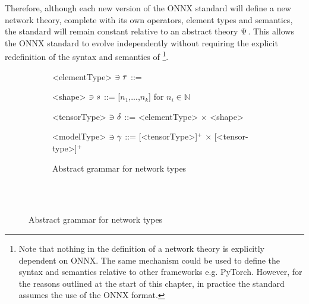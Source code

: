 Therefore, although each new version of the ONNX standard will define a new network theory, complete with its own operators, element types and semantics, the \vnnlib{} standard will remain constant relative to an abstract theory $\Psi$.
This allows the ONNX standard to evolve independently without requiring the explicit redefinition of the syntax and semantics of \vnnlib{}\footnote{
Note that nothing in the definition of a network theory is explicitly dependent on ONNX. 
The same mechanism could be used to define the syntax and semantics relative to other frameworks e.g. PyTorch. 
However, for the reasons outlined at the start of this chapter, in practice the \vnnlib{} standard assumes the use of the ONNX format.
}.

\begin{figure}
	\newcommand{\tensorOpOneSem}[2]{ 
		\semTensorType(#1) \rightarrow 
		\semTensorType(#2)
	}
	\newcommand{\tensorOpTwoSem}[3]{
		\semTensorType(#1) \rightarrow 
		\semTensorType(#2) \rightarrow 
		\semTensorType(#3) 
	}
	\newcommand{\compSem}[1]{
	\sem{#1} 
	&: \forall \tensorTypeVar. \; 
			\semTensorType(\tensorTypeVar) \rightarrow
			\semTensorType(\tensorTypeVar) \rightarrow
			\mathbb{B}
	&= \missing 
	}
	\newcommand{\opOneSem}[1]{
	\sem{#1}
	&: \forall \tensorTypeVar. \; 
			\tensorOpOneSem{\tensorTypeVar}{\tensorTypeVar}
	&= \missing 
	}
	\newcommand{\opTwoSem}[1]{
	\sem{#1} 
	&: \forall \tensorTypeVar. \; 
			\tensorOpTwoSem{\tensorTypeVar}{\tensorTypeVar}{\tensorTypeVar}
	&= \missing 
	}
	
	\begin{subfigure}{\textwidth}
	\setlength{\grammarindent}{9em}
	\begin{grammar}	
	<elementType> $\ni \tau$ ::= \missing	
	
	<shape> $\ni s$ ::= [$n_1$,...,$n_k$] \hspace{1em} for $n_i \in \mathbb{N}$ 
	
	<tensorType> $\ni \delta$ ::= <elementType>  $\times$ <shape>
	
	<modelType> $\ni \gamma$ ::= [<tensorType>]$^+$ $\times$ [<tensor-type>]$^+$
	\end{grammar}
	\caption{Abstract grammar for network types}
	\label{fig:onnx-type-syntax}
	\end{subfigure}
	\\
	\\
	

\end{figure}
